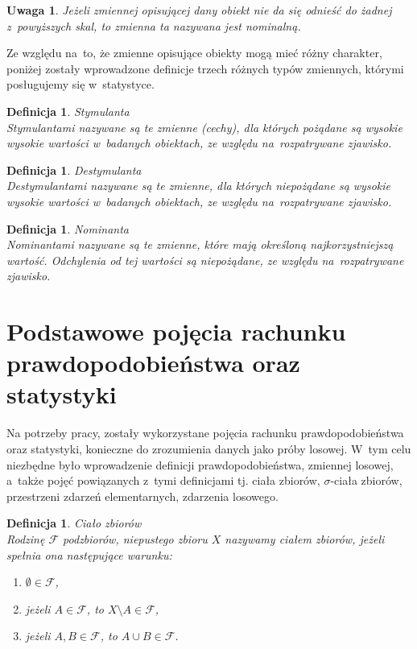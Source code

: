 \documentclass[12pt,a4paper]{report}
\newtheorem{definition}[theorem]{Definicja}
\newtheorem{uwaga}{Uwaga}
\begin{document}
\begin{uwaga}
Jeżeli zmiennej opisującej dany obiekt nie da się odnieść do żadnej z~powyższych skal, to zmienna ta nazywana jest nominalną.
\end{uwaga}

Ze względu na~to, że zmienne opisujące obiekty mogą mieć różny charakter, poniżej zostały wprowadzone definicje trzech różnych typów zmiennych, którymi posługujemy się w~statystyce. 

\begin{definition}{Stymulanta \cite[Rozdział 1.5]{panek2013}}\\
Stymulantami nazywane są te zmienne (cechy), dla których pożądane są wysokie wysokie wartości w~badanych obiektach, ze względu na~rozpatrywane zjawisko. 
\end{definition}

\begin{definition}{Destymulanta \cite[Rozdział 1.5]{panek2013}}\\
Destymulantami nazywane są te  zmienne, dla których niepożądane są wysokie wysokie wartości w~badanych obiektach, ze względu na~rozpatrywane zjawisko. 
\end{definition}

\begin{definition}{Nominanta \cite[Rozdział 1.5]{panek2013}}\\
Nominantami nazywane są te zmienne, które mają określoną najkorzystniejszą wartość. Odchylenia od tej wartości są niepożądane, ze względu na~rozpatrywane zjawisko. 
\end{definition}



\section{Podstawowe pojęcia rachunku prawdopodobieństwa oraz statystyki} \label{rachunek prawdopodobienstwa}


Na potrzeby pracy, zostały wykorzystane pojęcia rachunku prawdopodobieństwa oraz statystyki, konieczne do zrozumienia danych jako próby losowej. W~tym celu niezbędne było wprowadzenie definicji prawdopodobieństwa, zmiennej losowej, a~także pojęć powiązanych z~tymi definicjami tj. ciała zbiorów, $\sigma$-ciała zbiorów, przestrzeni zdarzeń elementarnych, zdarzenia losowego.


\begin{definition}{Ciało zbiorów \cite[Rozdział 8.1]{rudnicki2006}}\\
Rodzinę $\mathcal{F}$ podzbiorów, niepustego zbioru $X$ nazywamy ciałem zbiorów, jeżeli spełnia ona następujące warunku: 
\begin{enumerate}
\item $\emptyset \in \mathcal{F}$,
\item jeżeli $A \in \mathcal{F}$, to $X \setminus A \in \mathcal{F}$,
\item jeżeli $A, B \in \mathcal{F}$, to $A \cup B \in \mathcal{F}$.
\end{enumerate}
\end{definition}
\end{document}
